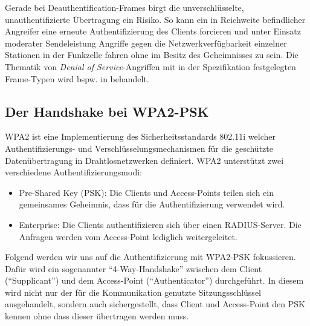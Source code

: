 Gerade bei Deauthentification-Frames birgt die unverschlüsselte, unauthentifizierte Übertragung ein Risiko.
So kann ein in Reichweite befindlicher Angreifer eine erneute Authentifizierung des Clients forcieren und unter Einsatz moderater Sendeleistung Angriffe gegen die Netzwerkverfügbarkeit einzelner Stationen in der Funkzelle fahren ohne im Besitz des Geheimnisses zu sein. 
Die Thematik von \textit{Denial of Service}-Angriffen mit in der Spezifikation festgelegten Frame-Typen wird bspw. in \cite{bernaschi2008access} behandelt.

\subsection{Der Handshake bei WPA2-PSK}\label{subs:handshake}
WPA2 ist eine Implementierung des Sicherheitsstandards 802.11i welcher Authentifizierungs- und Verschlüsselungsmechanismen für die geschützte Datenübertragung in Drahtlosnetzwerken definiert.
WPA2 unterstützt zwei verschiedene Authentifizierungsmodi: 
\begin{itemize}
	\item Pre-Shared Key (PSK): Die Clients und Access-Points teilen sich ein gemeinsames Geheimnis, dass für die Authentifizierung verwendet wird.
	\item Enterprise: Die Clients authentifizieren sich über einen RADIUS-Server. Die Anfragen werden vom Access-Point lediglich weitergeleitet.
\end{itemize}
Folgend werden wir uns auf die Authentifizierung mit WPA2-PSK fokussieren.
Dafür wird ein sogenannter \enquote{4-Way-Handshake} zwischen dem Client (\enquote{Supplicant}) und dem Access-Point (\enquote{Authenticator}) durchgeführt.
In diesem wird nicht nur der für die Kommunikation genutzte Sitzungsschlüssel ausgehandelt, sondern auch sichergestellt, dass Client und Access-Point den PSK kennen ohne dass dieser übertragen werden muss.

